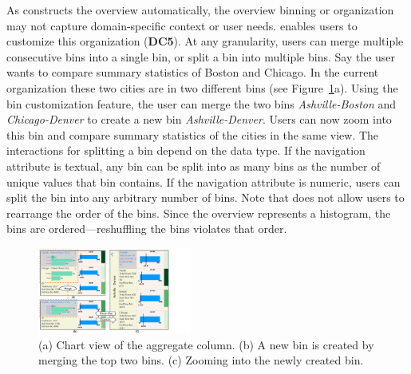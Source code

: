 As \noah constructs the overview automatically,
the overview binning or organization
may not capture domain-specific context
or user needs.
\noah enables users to customize this organization (\textbf{DC5}).
At any granularity, users can merge multiple consecutive bins
into a single bin, or split a bin into multiple bins.
Say the user wants to compare summary statistics
of Boston and Chicago.
In the current organization
these two cities are  
in two different bins (see Figure~\ref{fig:customize}a).
Using the bin customization feature,
the user can merge the two bins
\emph{Ashville-Boston} and \emph{Chicago-Denver} to create a new bin \emph{Ashville-Denver}.
Users can now zoom into this bin and
compare summary statistics of the cities in the same view.
The interactions for splitting a
bin depend on the data type.
If the navigation attribute is textual,
any bin can be split into as many bins as the
number of unique values that bin contains.
If the navigation attribute is numeric,
users can split the bin into any arbitrary number of bins.
Note that \noah does not allow users to rearrange the
order of the bins. Since the overview represents a histogram, the bins are ordered---reshuffling the bins violates that order.

\begin{figure}[!htb]
        \centering
        \vspace{-8pt}
        \includegraphics[width=0.45\textwidth,trim={0 0 130 0},clip]{images/customize.pdf}
\vspace{-10pt}
   \caption{(a) Chart view of the aggregate column. (b) A new bin is created by merging the top two bins. (c) Zooming into the newly created bin. }
\vspace{-10pt}
   \label{fig:customize}
 \end{figure}

